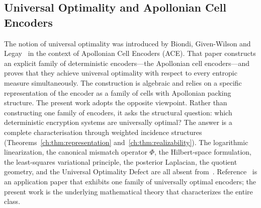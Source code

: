 \subsection*{Universal Optimality and Apollonian Cell Encoders}\label{ch:sec:universal-optimality-and-apollonian-cell-encoders}
The notion of universal optimality was introduced by Biondi,
Given-Wilson and Legay~\cite{biondi2018apollonian} in the context of
Apollonian Cell Encoders (ACE).  That paper constructs an explicit
family of deterministic encoders---the Apollonian cell encoders---and
proves that they achieve universal optimality with respect to every
entropic measure simultaneously.  The construction is algebraic and
relies on a specific representation of the encoder as a family of
cells with Apollonian packing structure.
The present work adopts the opposite viewpoint.  Rather than
constructing one family of encoders, it asks the structural question:
which deterministic encryption systems are universally optimal?  The
answer is a complete characterisation through weighted incidence
structures (Theorems~\ref{ch:thm:representation}
and~\ref{ch:thm:realizability}).  The logarithmic linearization, the
canonical mismatch operator $\Phi$, the Hilbert-space formulation, the
least-squares variational principle, the posterior Laplacian, the
quotient geometry, and the Universal Optimality Defect are all absent
from~\cite{biondi2018apollonian}.  Reference~\cite{biondi2018apollonian}
is an application paper that exhibits one family of universally optimal
encoders; the present work is the underlying mathematical theory that
characterizes the entire class.
